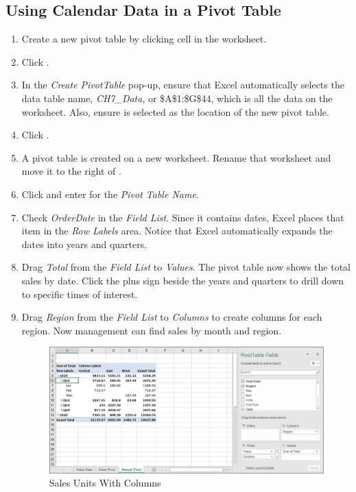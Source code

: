 \subsection{Using Calendar Data in a Pivot Table}

\begin{enumbox}
	\begin{enumerate}
		\item Create a new pivot table by clicking cell  in the  worksheet.
		\item Click .
		\item In the \textit{Create PivotTable} pop-up, ensure that Excel automatically selects the data table name, \textit{CH7\_Data}, or \$A\$1:\$G\$44, which is all the data on the worksheet. Also, ensure  is selected as the location of the new pivot table. 
		\item Click .
		\item A pivot table is created on a new worksheet. Rename that worksheet  and move it to the right of .
		\item Click  and enter  for the \textit{Pivot Table Name}.
		\item Check \textit{OrderDate} in the \textit{Field List}. Since it contains dates, Excel places that item in the \textit{Row Labels} area. Notice that Excel automatically expands the dates into years and quarters.
		\item Drag \textit{Total} from the \textit{Field List} to \textit{Values}. The pivot table now shows the total sales by date. Click the plus sign beside the years and quarters to drill down to specific times of interest.
		\item Drag \textit{Region} from the \textit{Field List} to \textit{Columns} to create columns for each region. Now management can find sales by month and region.

		\begin{figure}[H]
			\centering
			\includegraphics[width=\maxwidth{.95\linewidth}]{gfx/ch07_fig21}
			\caption{Sales Units With Columns}
			\label{07:fig21}
		\end{figure}


\end{enumerate}
\end{enumbox}
